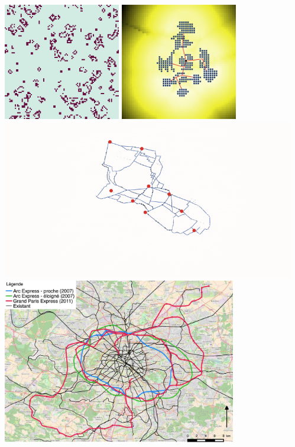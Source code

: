 \documentclass[english,11pt]{beamer}
\begin{document}
{\begin{columns}
\begin{column}{0.6\textwidth}
	\end{column}
	\begin{column}{0.4\textwidth}
		\centering
		\includegraphics[width=0.4\textwidth]{figures/parcours-gameoflife.png}\hspace{0.2cm}
		\includegraphics[width=0.4\textwidth]{figures/parcours-intro_RBD_lattice.png}\\
		\includegraphics[width=\textwidth]{figures/parcours-slimemould_reseauFinal.png}\\
		\vspace{-0.5cm}\includegraphics[width=0.8\textwidth]{figures/parcours-networks.jpg}
	\end{column}
	

\end{columns}}
\end{document}
